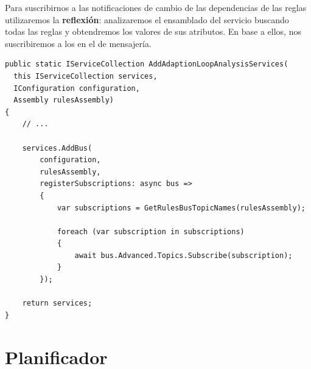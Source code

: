 Para suscribirnos a las notificaciones de cambio de las dependencias de las reglas utilizaremos la \textbf{reflexión}: analizaremos el ensamblado del servicio buscando todas las reglas y obtendremos los valores de sus atributos. En base a ellos, nos suscribiremos a los  en el  de mensajería.

\begin{lstlisting}[language={[Sharp]C},caption={Para suscribirnos a los \foreign{english}{topics} de las notificaciones obtenemos las dependencias de las reglas mediante reflexión},captionpos=b, label=ls:rules]
public static IServiceCollection AddAdaptionLoopAnalysisServices(
  this IServiceCollection services,
  IConfiguration configuration,
  Assembly rulesAssembly)
{
    // ...

    services.AddBus(
        configuration,
        rulesAssembly,
        registerSubscriptions: async bus =>
        {
            var subscriptions = GetRulesBusTopicNames(rulesAssembly);

            foreach (var subscription in subscriptions)
            {
                await bus.Advanced.Topics.Subscribe(subscription);
            }
        });

    return services;
}
\end{lstlisting}

\section{Planificador}

